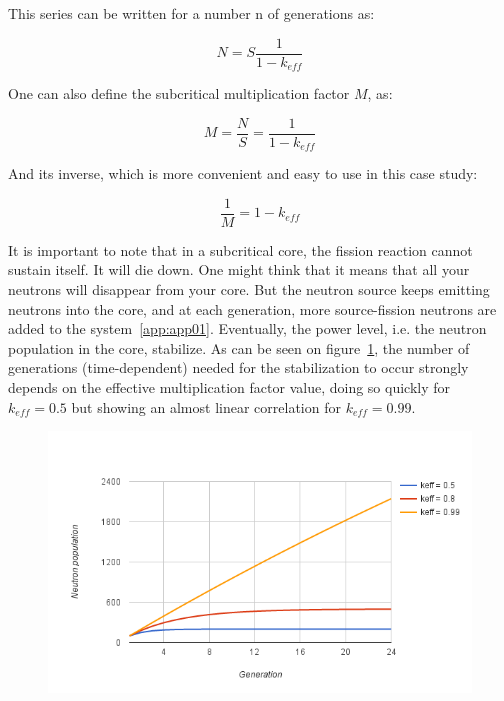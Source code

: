 This series can be written for a number n of generations as:

\begin{equation}\label{eq1}
N = S \frac{1}{1-k_{eff}}
\end{equation}

One can also define the subcritical multiplication factor $M$, as:

\begin{equation}\label{eq1}
M = \frac{N}{S} = \frac{1}{1-k_{eff}}
\end{equation}

And its inverse, which is more convenient and easy to use in this case study:

\begin{equation}\label{eq1}
\frac{1}{M} = 1-k_{eff}
\end{equation}

It is important to note that in a subcritical core, the fission reaction cannot sustain itself. It will die down. One might think that it means that all your neutrons will disappear from your core. But the neutron source keeps emitting neutrons into the core, and at each generation, more source-fission neutrons are added to the system~\ref{app:app01}. Eventually, the power level, i.e. the neutron population in the core, stabilize. As can be seen on figure~\ref{fig:neupop}, the number of generations (time-dependent) needed for the stabilization to occur strongly depends on the effective multiplication factor value, doing so quickly for $k_{eff} = 0.5$ but showing an almost linear correlation for $k_{eff} = 0.99$.

\begin{figure}[t!]
	\centering
	\includegraphics[height=0.4\textheight]{fig01/neupop.png}
	\label{fig:neupop}
\end{figure}

